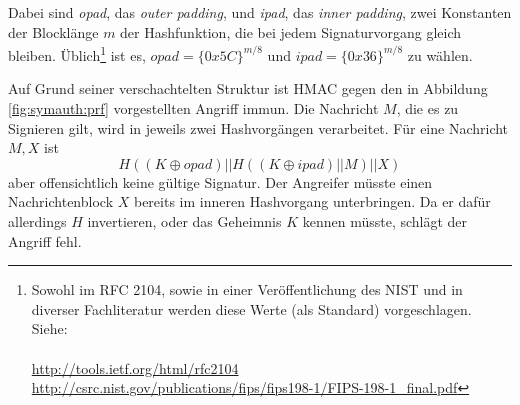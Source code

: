 Dabei sind \textit{opad}, das \textit{outer padding},
und \textit{ipad}, das \textit{inner padding}, zwei Konstanten der
Blocklänge $m$ der Hashfunktion, die bei jedem Signaturvorgang gleich
bleiben. Üblich\footnote{Sowohl im RFC 2104, sowie in einer
  Veröffentlichung des NIST und in diverser Fachliteratur werden diese
  Werte (als Standard) vorgeschlagen. Siehe: ~\\~\\
  \url{http://tools.ietf.org/html/rfc2104} \\
  \url{http://csrc.nist.gov/publications/fips/fips198-1/FIPS-198-1_final.pdf}}
ist es, $opad = \{0x5C\}^{m/8}$ und $ipad = \{0x36\}^{m/8}$ zu
wählen. 

Auf Grund seiner verschachtelten Struktur ist HMAC gegen den in
Abbildung \ref{fig:symauth:prf} vorgestellten Angriff immun.
Die Nachricht $M$, die es zu Signieren gilt, wird in jeweils zwei
Hash\-vorgängen verarbeitet. Für eine Nachricht $M,X$ ist
\begin{equation*}
 H((K \oplus \textit{opad})|| H((K \oplus \textit{ipad})|| M)|| X)
\end{equation*} 
aber offensichtlich keine gültige Signatur. Der
Angreifer müsste einen Nachrichtenblock $X$ bereits im inneren
Hashvorgang unterbringen. Da er dafür allerdings $H$ invertieren, oder
das Geheimnis $K$ kennen müsste, schlägt der Angriff fehl.